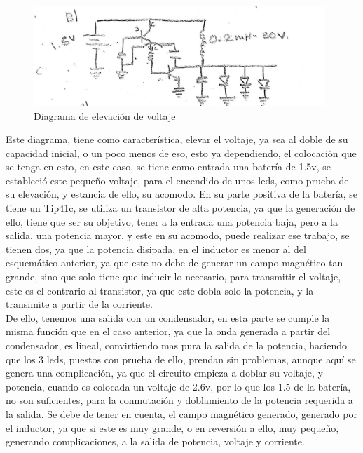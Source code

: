 \documentclass[12pt,letterpaper]{article}
\begin{document}
\begin{figure}[hbtp]
\centering
\includegraphics[width=11cm]{esquema2.jpeg}
\caption{Diagrama de elevación de voltaje}
\end{figure}

Este diagrama, tiene como característica, elevar el voltaje, ya sea al doble de su capacidad inicial, o un poco menos de eso, esto ya dependiendo, el colocación que se tenga en esto, en este caso, se tiene como entrada una batería de 1.5v, se estableció este pequeño voltaje, para el encendido de unos leds, como prueba de su elevación, y estancia de ello, su acomodo. En su parte positiva de la batería, se tiene un Tip41c, se utiliza un transistor de alta potencia, ya que la generación de ello, tiene que ser su objetivo, tener a la entrada una potencia baja, pero a la salida, una potencia mayor, y este en su acomodo, puede realizar ese trabajo, se tienen dos, ya que la potencia disipada, en el inductor es menor al del esquemático anterior, ya que este no debe de generar un campo magnético tan grande, sino que solo tiene que inducir lo necesario, para transmitir el voltaje, este es el contrario al transistor, ya que este dobla solo la potencia, y la transimite a partir de la corriente.\\

De ello, tenemos una salida con un condensador, en esta parte se cumple la misma función que en el caso anterior, ya que la onda generada a partir del condensador, es lineal, convirtiendo mas pura la salida de la potencia, haciendo que los 3 leds, puestos con prueba de ello, prendan sin problemas, aunque aquí se genera una complicación, ya que el circuito empieza  a doblar su voltaje, y potencia, cuando es colocada un voltaje de 2.6v, por lo que los 1.5 de la batería, no son suficientes, para la conmutación y doblamiento de la potencia requerida a la salida. Se debe de tener en cuenta, el campo magnético generado, generado por el inductor, ya que si este es muy grande, o en reversión a ello, muy pequeño, generando complicaciones, a la salida de potencia, voltaje y corriente.\\
\end{document}
